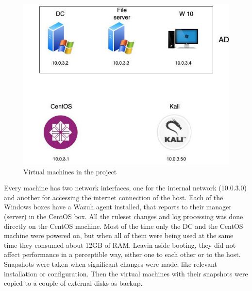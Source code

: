 \begin{figure}[H]
  \centering
	\includegraphics[width=\textwidth]{figuras/virtual_machines.jpg}
	\caption{Virtual machines in the project}
\end{figure}
\linej
Every machine has two network interfaces, one for the internal network (10.0.3.0) and another for accessing the internet connection of the host.
Each of the Windows boxes have a Wazuh agent installed, that reports to their manager (server) in the CentOS box.
All the ruleset changes and log processing was done directly on the CentOS machine.
\linej
\linej
Most of the time only the DC and the CentOS machine were powered on, but when all of them were being used at the same time they consumed about 12GB of RAM. Leavin aside booting, they did not affect performance in a perceptible way, either one to each other or to the host.
\linej
Snapshots were taken when significant changes were made, like relevant installation or configuration. Then the virtual machines with their snapshots were copied to a couple of external disks as backup.
